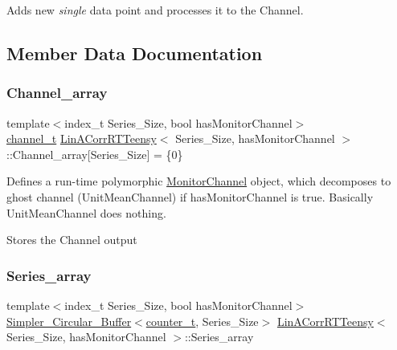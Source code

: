 Adds new {\itshape single} data point and processes it to the {\ttfamily Channel}. 



\subsection{Member Data Documentation}
\mbox{\label{classLinACorrRTTeensy_a3276cb9bb215af9676edc35958c889b8}} 
\subsubsection{\texorpdfstring{Channel\+\_\+array}{Channel\_array}}
{\footnotesize\ttfamily template$<$index\+\_\+t Series\+\_\+\+Size, bool has\+Monitor\+Channel$>$ \\
\hyperlink{types_8hpp_a75c7fcc48d1c8ecab2174a01ab7eb21c}{channel\+\_\+t} \hyperlink{classLinACorrRTTeensy}{Lin\+A\+Corr\+R\+T\+Teensy}$<$ Series\+\_\+\+Size, has\+Monitor\+Channel $>$\+::Channel\+\_\+array\mbox{[}Series\+\_\+\+Size\mbox{]} = \{0\}}



Defines a run-\/time polymorphic \hyperlink{classMonitorChannel}{Monitor\+Channel} object, which decomposes to {\ttfamily ghost} channel (Unit\+Mean\+Channel) if {\ttfamily has\+Monitor\+Channel} is true. Basically {\ttfamily Unit\+Mean\+Channel} does nothing. 

Stores the Channel output \mbox{\label{classLinACorrRTTeensy_a5c4cc1fe032812d6290579c7c8b22e57}} 
\subsubsection{\texorpdfstring{Series\+\_\+array}{Series\_array}}
{\footnotesize\ttfamily template$<$index\+\_\+t Series\+\_\+\+Size, bool has\+Monitor\+Channel$>$ \\
\hyperlink{classSimpler__Circular__Buffer}{Simpler\+\_\+\+Circular\+\_\+\+Buffer}$<$\hyperlink{types_8hpp_a22f279793847eba127de149437848c48}{counter\+\_\+t}, Series\+\_\+\+Size$>$ \hyperlink{classLinACorrRTTeensy}{Lin\+A\+Corr\+R\+T\+Teensy}$<$ Series\+\_\+\+Size, has\+Monitor\+Channel $>$\+::Series\+\_\+array}



